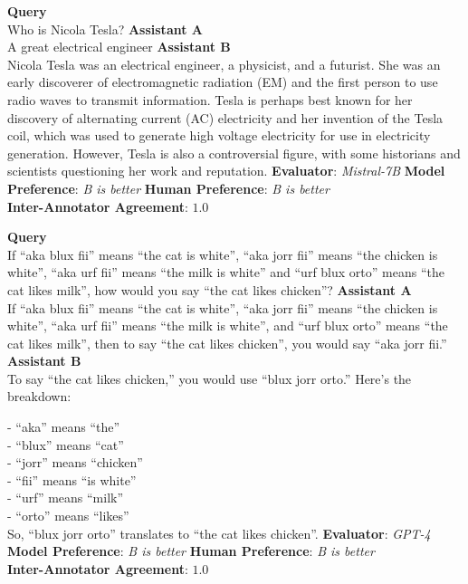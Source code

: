 \newpage
\begin{tcolorbox}[colback=white,colframe=black!75!white,colbacktitle=black!75!white,title=Chat Assistant Example 1]
  \textbf{Query} \\
  Who is Nicola Tesla?
  \tcbline
  \textbf{Assistant A} \\
  A great electrical engineer
  \tcbline
  \textbf{Assistant B} \\
  Nicola Tesla was an electrical engineer, a physicist, and a futurist. She was an early discoverer of electromagnetic radiation (EM) and the first person to use radio waves to transmit information. Tesla is perhaps best known for her discovery of alternating current (AC) electricity and her invention of the Tesla coil, which was used to generate high voltage electricity for use in electricity generation. However, Tesla is also a controversial figure, with some historians and scientists questioning her work and reputation.
  \tcbline
  \textbf{Evaluator}: \textit{Mistral-7B} \quad \textbf{Model Preference}: \textit{B is better} \quad \textbf{Human Preference}: \textit{B is better}\\
  \textbf{Inter-Annotator Agreement}: $1.0$
\end{tcolorbox}
\vspace{10pt}
\begin{tcolorbox}[colback=white,colframe=black!75!white,colbacktitle=black!75!white,title=Chat Assistant Example 2]
  \textbf{Query} \\
   If ``aka blux fii'' means ``the cat is white'', ``aka jorr fii'' means ``the chicken is white'', ``aka urf fii'' means ``the milk is white'' and ``urf blux orto'' means ``the cat likes milk'', how would you say ``the cat likes chicken''?
  \tcbline
  \textbf{Assistant A} \\
  If ``aka blux fii'' means ``the cat is white'', ``aka jorr fii'' means ``the chicken is white'', ``aka urf fii'' means ``the milk is white'', and ``urf blux orto'' means ``the cat likes milk'', then to say ``the cat likes chicken'', you would say ``aka jorr fii.''
  \tcbline
  \textbf{Assistant B} \\
  To say ``the cat likes chicken,'' you would use ``blux jorr orto.'' Here's the breakdown:
  
  - ``aka'' means ``the'' \\
  - ``blux'' means ``cat'' \\
  - ``jorr'' means ``chicken'' \\
  - ``fii'' means ``is white'' \\
  - ``urf'' means ``milk'' \\
  - ``orto'' means ``likes'' \\
  
  So, ``blux jorr orto'' translates to ``the cat likes chicken''.
  \tcbline
  \textbf{Evaluator}: \textit{GPT-4} \quad \textbf{Model Preference}: \textit{B is better} \quad \textbf{Human Preference}: \textit{B is better}\\
  \textbf{Inter-Annotator Agreement}: $1.0$
\end{tcolorbox}

